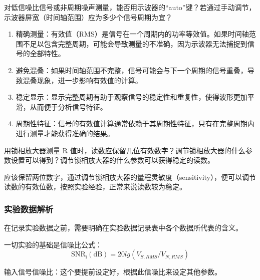 \documentclass[dvipsnames, svgnames,a4paper,11pt]{article}
\begin{document}
	\begin{question}
		对低信噪比信号或非周期噪声测量，能否用示波器的“auto”键？若通过手动调节，示波器屏宽（时间轴范围）应为多少个信号周期为宜？
	\end{question}
\begin{enumerate}
	\item  精确测量：有效值（RMS）是信号在一个周期内的功率等效值。如果时间轴范围不足以包含完整周期，可能会导致测量的不准确，因为示波器无法捕捉到信号的全部特性。
	\item  避免混叠：如果时间轴范围不完整，信号可能会与下一个周期的信号重叠，导致混叠现象，进一步影响有效值的计算。
	\item 稳定显示：显示完整周期有助于观察信号的稳定性和重复性，使得波形更加平滑，从而便于分析信号特征。
	\item 周期性特征：信号的有效值计算通常依赖于其周期性特征，只有在完整周期内进行测量才能获得准确的结果。
\end{enumerate}

	
\begin{question}
	用锁相放大器测量 R 值时，读数应保留几位有效数字？调节锁相放大器的什么参数设置可以得到？调节锁相放大器的什么参数可以获得稳定的读数。
\end{question}
应该保留两位数字，通过调节锁相放大器的量程灵敏度（sensitivity），便可以调节读数的有效位数，按照实验经验，正常来说读数较为稳定。
\subsubsection{实验数据解析}
在记录实验数据之前，需要明确在实验数据记录表中各个数据所代表的含义。

一切实验的基础是信噪比公式：$$\mathrm{SNR_{i}(dB)}=20lg(V_{S,RMS}/V_{N,RMS})$$

输入信号信噪比：这个要提前设定好，根据此信噪比来设定其他参数。
\end{document}
